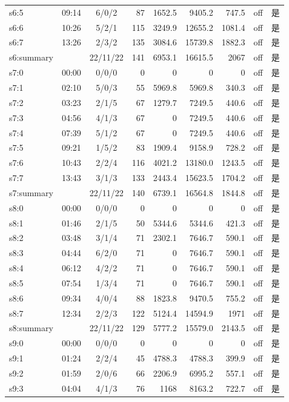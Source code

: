 \begin{tabular}{@{}llcrrrrrc@{}}
s6:5 & 09:14 & 6/0/2 & 87 & 1652.5 & 9405.2 & 747.5 & off & 是\\
s6:6 & 10:26 & 5/2/1 & 115 & 3249.9 & 12655.2 & 1081.4 & off & 是\\
s6:7 & 13:26 & 2/3/2 & 135 & 3084.6 & 15739.8 & 1882.3 & off & 是\\
s6:summary &  & 22/11/22 & 141 & 6953.1 & 16615.5 & 2067 & off & 是\\
s7:0 & 00:00 & 0/0/0 & 0 & 0 & 0 & 0 & off & 是\\
s7:1 & 02:10 & 5/0/3 & 55 & 5969.8 & 5969.8 & 340.3 & off & 是\\
s7:2 & 03:23 & 2/1/5 & 67 & 1279.7 & 7249.5 & 440.6 & off & 是\\
s7:3 & 04:56 & 4/1/3 & 67 & 0 & 7249.5 & 440.6 & off & 是\\
s7:4 & 07:39 & 5/1/2 & 67 & 0 & 7249.5 & 440.6 & off & 是\\
s7:5 & 09:21 & 1/5/2 & 83 & 1909.4 & 9158.9 & 728.2 & off & 是\\
s7:6 & 10:43 & 2/2/4 & 116 & 4021.2 & 13180.0 & 1243.5 & off & 是\\
s7:7 & 13:43 & 3/1/3 & 133 & 2443.4 & 15623.5 & 1704.2 & off & 是\\
s7:summary &  & 22/11/22 & 140 & 6739.1 & 16564.8 & 1844.8 & off & 是\\
s8:0 & 00:00 & 0/0/0 & 0 & 0 & 0 & 0 & off & 是\\
s8:1 & 01:46 & 2/1/5 & 50 & 5344.6 & 5344.6 & 421.3 & off & 是\\
s8:2 & 03:48 & 3/1/4 & 71 & 2302.1 & 7646.7 & 590.1 & off & 是\\
s8:3 & 04:44 & 6/2/0 & 71 & 0 & 7646.7 & 590.1 & off & 是\\
s8:4 & 06:12 & 4/2/2 & 71 & 0 & 7646.7 & 590.1 & off & 是\\
s8:5 & 07:54 & 1/3/4 & 71 & 0 & 7646.7 & 590.1 & off & 是\\
s8:6 & 09:34 & 4/0/4 & 88 & 1823.8 & 9470.5 & 755.2 & off & 是\\
s8:7 & 12:34 & 2/2/3 & 122 & 5124.4 & 14594.9 & 1971 & off & 是\\
s8:summary &  & 22/11/22 & 129 & 5777.2 & 15579.0 & 2143.5 & off & 是\\
s9:0 & 00:00 & 0/0/0 & 0 & 0 & 0 & 0 & off & 是\\
s9:1 & 01:24 & 2/2/4 & 45 & 4788.3 & 4788.3 & 399.9 & off & 是\\
s9:2 & 01:59 & 2/0/6 & 66 & 2206.9 & 6995.2 & 557.1 & off & 是\\
s9:3 & 04:04 & 4/1/3 & 76 & 1168 & 8163.2 & 722.7 & off & 是\\

\end{tabular}
